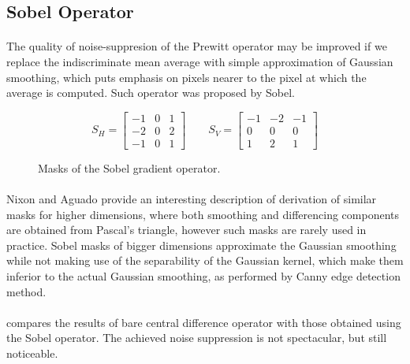 \subsection{Sobel Operator}

\paragraph*{}
The quality of noise-suppresion of the Prewitt operator may be improved if we replace the indiscriminate mean average with simple approximation of Gaussian smoothing, which puts emphasis on pixels nearer to the pixel at which the average is computed. Such operator was proposed by Sobel.

\begin{figure}[h!]
\begin{equation*}
S_{H} = 
	\begin{bmatrix}
	-1 & 0 & 1 \\
	-2 & 0 & 2 \\
	-1 & 0 & 1
	\end{bmatrix}\qquad
S_{V} = 
	\begin{bmatrix}
	-1 & -2 & -1 \\
	0 & 0 & 0 \\
	1 & 2 & 1
	\end{bmatrix}
\end{equation*}
\caption{Masks of the Sobel gradient operator.}
\label{fig:SobelMasks}
\end{figure}

\paragraph*{}
Nixon and Aguado provide\cite{NixonAguado08} an interesting description of derivation of similar masks for higher dimensions, where both smoothing and differencing components are obtained from Pascal's triangle, however such masks are rarely used in practice. Sobel masks of bigger dimensions approximate the Gaussian smoothing while not making use of the separability of the Gaussian kernel, which make them inferior to the actual Gaussian smoothing, as performed by Canny edge detection method.

\paragraph*{}
 compares the results of bare central difference operator with those obtained using the Sobel operator. The achieved noise suppression is not spectacular, but still noticeable.


